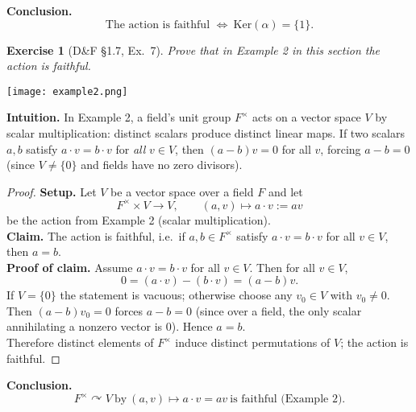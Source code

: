 \documentclass[12pt]{article}
\newtheorem{exercise}[theorem]{Exercise}
\theoremstyle{definition}
\begin{document}
\noindent\textbf{Conclusion.}
\[
\boxed{\,\text{The action is faithful } \Longleftrightarrow\ \mathrm{Ker}(\alpha)=\{1\}.\,}
\]

\newpage

\begin{exercise}[D\&F §1.7, Ex.~7]
Prove that in Example 2 in this section the action is faithful.
\end{exercise}

\begin{center}
    \texttt{[image: example2.png]}
\end{center}

\dotfill

\noindent\textbf{Intuition.}
In Example 2, a field’s unit group $F^\times$ acts on a vector space $V$ by scalar multiplication:
distinct scalars produce distinct linear maps. If two scalars $a,b$ satisfy $a\cdot v=b\cdot v$ for \emph{all} $v\in V$,
then $(a-b)v=0$ for all $v$, forcing $a-b=0$ (since $V\neq\{0\}$ and fields have no zero divisors).

\dotfill

\begin{proof}
\noindent\textbf{Setup.} Let $V$ be a vector space over a field $F$ and let
\[
F^\times \times V \longrightarrow V,\qquad (a,v)\longmapsto a\cdot v:=av
\]
be the action from Example 2 (scalar multiplication).\\

\noindent\textbf{Claim.} The action is faithful, i.e.\ if $a,b\in F^\times$ satisfy $a\cdot v=b\cdot v$ for all $v\in V$,
then $a=b$.\\

\noindent\textbf{Proof of claim.}
Assume $a\cdot v=b\cdot v$ for all $v\in V$. Then for all $v\in V$,
\[
0=(a\cdot v)-(b\cdot v)=(a-b)v.
\]
If $V=\{0\}$ the statement is vacuous; otherwise choose any $v_0\in V$ with $v_0\neq 0$.
Then $(a-b)v_0=0$ forces $a-b=0$ (since over a field, the only scalar annihilating a nonzero vector is $0$).
Hence $a=b$.\\

\noindent Therefore distinct elements of $F^\times$ induce distinct permutations of $V$; the action is faithful.
\end{proof}

\noindent\textbf{Conclusion.}
\[
\boxed{\,F^\times\curvearrowright V\ \text{by}\ (a,v)\mapsto a\cdot v=av\ \text{is faithful (Example 2).}\,}
\]

\newpage
\end{document}
